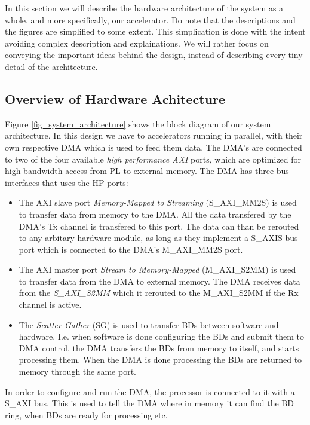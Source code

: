 In this section we will describe the hardware architecture of the system as a whole, and more specifically, our accelerator. Do note that the descriptions and the figures are simplified to some extent. This simplication is done with the intent avoiding complex description and explainations. We will rather focus on conveying the important ideas behind the design, instead of describing every tiny detail of the architecture. 

\subsection{Overview of Hardware Achitecture}

Figure \ref{fig_system_architecture} shows the block diagram of our system architecture. In this design we have to accelerators running in parallel, with their own respective DMA which is used to feed them data. The DMA's are connected to two of the four available \textit{high performance AXI} ports, which are optimized for high bandwidth access from PL to external memory. The DMA has three bus interfaces that uses the HP ports:

\begin{itemize}
\item The AXI slave port \textit{Memory-Mapped to Streaming} (S\_AXI\_MM2S) is used to transfer data from memory to the DMA. All the data transfered by the DMA's Tx channel is transfered to this port. The data can than be rerouted to any arbitary hardware module, as long as they implement a S\_AXIS bus port which is connected to the DMA's M\_AXI\_MM2S port. 
\item The AXI master port \textit{Stream to Memory-Mapped} (M\_AXI\_S2MM) is used to transfer data from the DMA to external memory. The DMA receives data from the \textit{S\_AXI\_S2MM} which it rerouted to the M\_AXI\_S2MM if the Rx channel is active.
\item The \textit{Scatter-Gather} (SG) is used to transfer BDs between software and hardware. I.e. when software is done configuring the BDs and submit them to DMA control, the DMA transfers the BDs from memory to itself, and starts processing them. When the DMA is done processing the BDs are returned to memory through the same port. 
\end{itemize}

In order to configure and run the DMA, the processor is connected to it with a S\_AXI bus. This is used to tell the DMA where in memory it can find the BD ring, when BDs are ready for processing etc.

